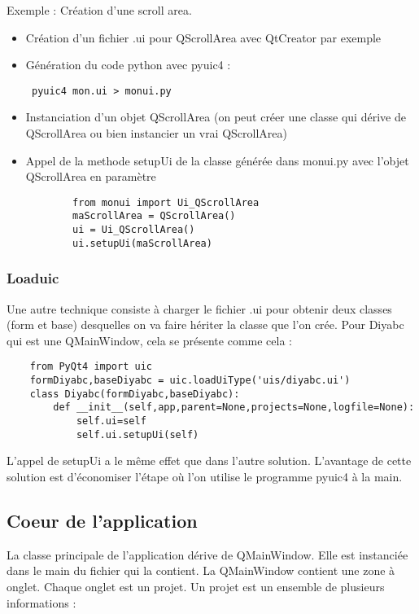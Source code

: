 \documentclass[12pt,a4paper]{article}
\begin{document}
        Exemple : Création d'une scroll area.\\
        \begin{itemize}
            \item Création d'un fichier .ui pour QScrollArea avec QtCreator par
                exemple
            \item Génération du code python avec pyuic4 :\begin{verbatim} pyuic4 mon.ui > monui.py \end{verbatim}
            \item Instanciation d'un objet QScrollArea (on peut créer une classe qui dérive de QScrollArea ou bien instancier un vrai QScrollArea)
            \item Appel de la methode setupUi de la classe générée dans monui.py avec l'objet QScrollArea en paramètre
                \begin{verbatim}
        from monui import Ui_QScrollArea
        maScrollArea = QScrollArea()
        ui = Ui_QScrollArea()
        ui.setupUi(maScrollArea)
\end{verbatim}
        \end{itemize}
    \subsubsection{Loaduic}
    Une autre technique consiste à charger le fichier .ui pour obtenir deux
    classes (form et base) desquelles on va faire hériter la classe que l'on
    crée. Pour Diyabc qui est une QMainWindow, cela se présente comme cela :
    \begin{verbatim}
    from PyQt4 import uic
    formDiyabc,baseDiyabc = uic.loadUiType('uis/diyabc.ui')
    class Diyabc(formDiyabc,baseDiyabc):
        def __init__(self,app,parent=None,projects=None,logfile=None):
            self.ui=self
            self.ui.setupUi(self)
\end{verbatim}
    L'appel de setupUi a le même effet que dans l'autre solution. L'avantage de
    cette solution est d'économiser l'étape où l'on utilise le programme pyuic4
    à la main.
    \subsection{Coeur de l'application}
        La classe principale de l'application dérive de QMainWindow. Elle est
        instanci\'ee dans le main du fichier qui la contient. La QMainWindow
        contient une zone à onglet. Chaque onglet est un projet. Un projet est
        un ensemble de plusieurs informations :\\
\end{document}
